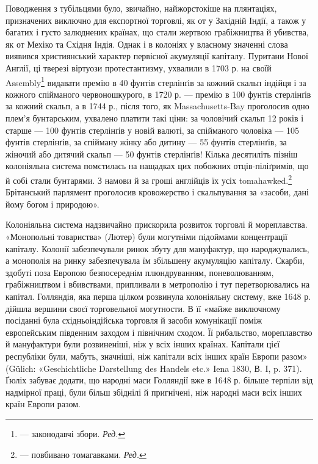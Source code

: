 Поводження з тубільцями було, звичайно, найжорстокіше
на плянтаціях, призначених виключно для експортної торговлі,
як от у Західній Індії, а також у багатих і густо залюднених
країнах, що стали жертвою грабіжництва й убивства, як от Мехіко
та Східня Індія. Однак і в колоніях у власному значенні
слова виявився християнський характер первісної акумуляції
капіталу. Пуритани Нової Англії, ці тверезі віртуози протестантизму,
ухвалили в 1703 р. на своїй Assembly\footnote*{
— законодавчі збори. \emph{Ред.}
} видавати премію
в 40 фунтів стерлінґів за кожний скальп індійця і за кожного
спійманого червоношкурого, в 1720 р. — премію в 100 фунтів
стерлінґів за кожний скальп, а в 1744 р., після того, як Massachusetts-Bay
проголосив одно плем’я бунтарським, ухвалено платити
такі ціни: за чоловічий скальп 12 років і старше — 100 фунтів стерлінґів у новій валюті, за
спійманого чоловіка — 105 фунтів стерлінґів, за спійману жінку або дитину — 55 фунтів стерлінґів, за
жіночий або дитячий скальп — 50 фунтів стерлінґів!
Кілька десятиліть пізніш колоніяльна система помстилась на нащадках цих побожних отців-піліґримів,
що й собі стали бунтарями. З намови й за гроші англійців їх усіх tomahawked.\footnote*{
— повбивано томагавками. \emph{Ред.}
} Брітанський парлямент
проголосив кровожерство і скальпування
за «засоби, дані йому богом і природою».

Колоніяльна система надзвичайно прискорила розвиток торговлі й мореплавства. «Монопольні товариства»
(Лютер) були могутніми підоймами концентрації капіталу. Колонії забезпечували ринок збуту для
мануфактур, що народжувались, а монополія на ринку забезпечувала їм збільшену акумуляцію капіталу.
Скарби, здобуті поза Европою безпосереднім плюндруванням, поневолюванням, грабіжництвом і
вбивствами, припливали в метрополію і тут перетворювались на капітал. Голляндія, яка перша цілком
розвинула колоніяльну систему, вже 1648 р. дійшла вершини своєї торговельної могутности. В її «майже
виключному посіданні була східньоіндійська торговля й засоби
комунікації поміж европейським південним заходом і північним сходом. Її рибальство, мореплавство й
мануфактури були розвиненіші, ніж у всіх інших країнах. Капітали цієї республіки були, мабуть,
значніші, ніж капітали всіх інших країн Европи разом» (Gülich: «Geschichtliche Darstellung des
Handels etc.» Iena 1830, В. I, p. 371). Ґюліх забуває додати, що народні маси Голляндії вже в 1648
р. більше терпіли від надмірної праці, були більш збіднілі й пригнічені, ніж народні маси всіх інших
країн Европи разом.

